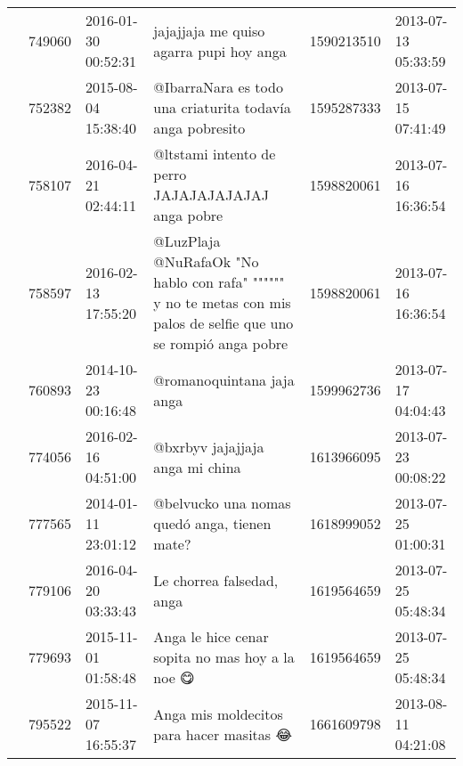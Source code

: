 \begin{tabular}{llllrl}
           & 749060  & 2016-01-30 00:52:31 &                                                                                                      jajajjaja me quiso agarra pupi hoy anga &  1590213510 & 2013-07-13 05:33:59 \\
           & 752382  & 2015-08-04 15:38:40 &                                                                                    @IbarraNara es todo una criaturita todavía anga pobresito &  1595287333 & 2013-07-15 07:41:49 \\
           & 758107  & 2016-04-21 02:44:11 &                                                                                           @ltstami intento de perro JAJAJAJAJAJAJ anga pobre &  1598820061 & 2013-07-16 16:36:54 \\
           & 758597  & 2016-02-13 17:55:20 &                            @LuzPlaja @NuRafaOk "No hablo con rafa" """""" y no te metas con mis palos de selfie que uno se rompió anga pobre &  1598820061 & 2013-07-16 16:36:54 \\
           & 760893  & 2014-10-23 00:16:48 &                                                                                                                    @romanoquintana jaja anga &  1599962736 & 2013-07-17 04:04:43 \\
           & 774056  & 2016-02-16 04:51:00 &                                                                                                              @bxrbyv jajajjaja anga mi china &  1613966095 & 2013-07-23 00:08:22 \\
           & 777565  & 2014-01-11 23:01:12 &                                                                                                 @belvucko una nomas quedó anga, tienen mate? &  1618999052 & 2013-07-25 01:00:31 \\
           & 779106  & 2016-04-20 03:33:43 &                                                                                                                    Le chorrea falsedad, anga &  1619564659 & 2013-07-25 05:48:34 \\
           & 779693  & 2015-11-01 01:58:48 &                                                                                              Anga le hice cenar sopita no mas hoy a la noe 😋 &  1619564659 & 2013-07-25 05:48:34 \\
           & 795522  & 2015-11-07 16:55:37 &                                                                                                     Anga mis moldecitos para hacer masitas 😂 &  1661609798 & 2013-08-11 04:21:08 \\

\end{tabular}
